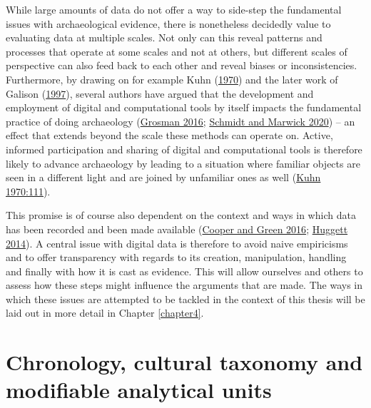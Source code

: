 \documentclass[
  12pt,
  a4paper,
  oneside]{book}
\begin{document}
While large amounts of data do not offer a way to side-step the fundamental issues with archaeological evidence, there is nonetheless decidedly value to evaluating data at multiple scales. Not only can this reveal patterns and processes that operate at some scales and not at others, but different scales of perspective can also feed back to each other and reveal biases or inconsistencies. Furthermore, by drawing on for example Kuhn (\protect\hyperlink{ref-kuhn1970}{1970}) and the later work of Galison (\protect\hyperlink{ref-galison1997}{1997}), several authors have argued that the development and employment of digital and computational tools by itself impacts the fundamental practice of doing archaeology (\protect\hyperlink{ref-grosman2016}{Grosman 2016}; \protect\hyperlink{ref-schmidt2020}{Schmidt and Marwick 2020}) -- an effect that extends beyond the scale these methods can operate on. Active, informed participation and sharing of digital and computational tools is therefore likely to advance archaeology by leading to a situation where \textquotesingle familiar objects are seen in a different light and are joined by unfamiliar ones as well\textquotesingle{} (\protect\hyperlink{ref-kuhn1970}{Kuhn 1970:111}).

This promise is of course also dependent on the context and ways in which data has been recorded and been made available (\protect\hyperlink{ref-cooper2016}{Cooper and Green 2016}; \protect\hyperlink{ref-huggett2014}{Huggett 2014}). A central issue with digital data is therefore to avoid naive empiricisms and to offer transparency with regards to its creation, manipulation, handling and finally with how it is cast as evidence. This will allow ourselves and others to assess how these steps might influence the arguments that are made. The ways in which these issues are attempted to be tackled in the context of this thesis will be laid out in more detail in Chapter \ref{chapter4}.

\hypertarget{chronology-cultural-taxonomy-and-modifiable-analytical-units}{%
\section{Chronology, cultural taxonomy and modifiable analytical units}\label{chronology-cultural-taxonomy-and-modifiable-analytical-units}}

\end{document}
